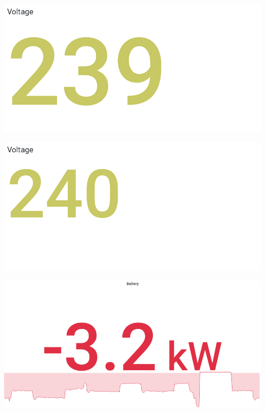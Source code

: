 \documentclass{article}
\begin{document}
\begin{center}
\par
\vspace{0.5cm}
\par
\vspace{0.5cm}
\includegraphics[width=\textwidth]{image28}
\par
\vspace{0.5cm}
\par
\vspace{0.5cm}
\includegraphics[width=\textwidth]{image30}
\par
\vspace{0.5cm}
\par
\vspace{0.5cm}
\includegraphics[width=\textwidth]{image6}

\end{center}
\end{document}
